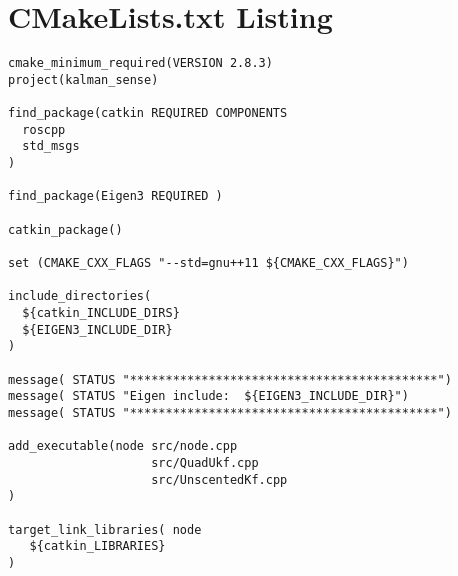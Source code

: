 \chapter{CMakeLists.txt Listing}

\begin{verbatim}
cmake_minimum_required(VERSION 2.8.3)
project(kalman_sense)

find_package(catkin REQUIRED COMPONENTS
  roscpp
  std_msgs
)

find_package(Eigen3 REQUIRED )

catkin_package()

set (CMAKE_CXX_FLAGS "--std=gnu++11 ${CMAKE_CXX_FLAGS}")

include_directories(
  ${catkin_INCLUDE_DIRS}
  ${EIGEN3_INCLUDE_DIR}
)

message( STATUS "*******************************************")
message( STATUS "Eigen include:  ${EIGEN3_INCLUDE_DIR}")
message( STATUS "*******************************************")

add_executable(node src/node.cpp
                    src/QuadUkf.cpp
                    src/UnscentedKf.cpp
)

target_link_libraries( node
   ${catkin_LIBRARIES}
)
\end{verbatim}